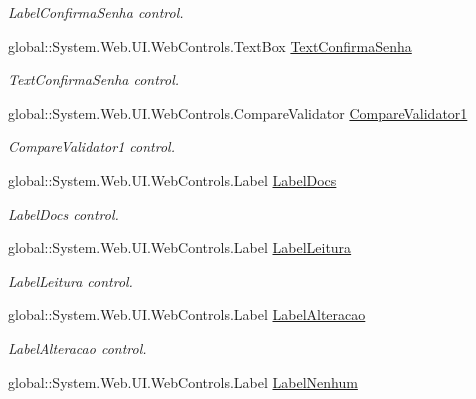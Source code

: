\begin{DoxyCompactItemize}
\begin{DoxyCompactList}\small\item\em LabelConfirmaSenha control. \item\end{DoxyCompactList}\item 
global::System.Web.UI.WebControls.TextBox \hyperlink{class_sistema_r_h_1_1_cadastro_user_a229680f0d1904176b3326e112b2e08b4}{TextConfirmaSenha}
\begin{DoxyCompactList}\small\item\em TextConfirmaSenha control. \item\end{DoxyCompactList}\item 
global::System.Web.UI.WebControls.CompareValidator \hyperlink{class_sistema_r_h_1_1_cadastro_user_adb506525ca9a486d2a2af45ca2ebfeea}{CompareValidator1}
\begin{DoxyCompactList}\small\item\em CompareValidator1 control. \item\end{DoxyCompactList}\item 
global::System.Web.UI.WebControls.Label \hyperlink{class_sistema_r_h_1_1_cadastro_user_aaeb55ba4d615da19496bdd9cca8830d0}{LabelDocs}
\begin{DoxyCompactList}\small\item\em LabelDocs control. \item\end{DoxyCompactList}\item 
global::System.Web.UI.WebControls.Label \hyperlink{class_sistema_r_h_1_1_cadastro_user_a5854d3064b2bd301797b09d1da2575f6}{LabelLeitura}
\begin{DoxyCompactList}\small\item\em LabelLeitura control. \item\end{DoxyCompactList}\item 
global::System.Web.UI.WebControls.Label \hyperlink{class_sistema_r_h_1_1_cadastro_user_af660906708afbeb2ef5533a8cb9e3e05}{LabelAlteracao}
\begin{DoxyCompactList}\small\item\em LabelAlteracao control. \item\end{DoxyCompactList}\item 
global::System.Web.UI.WebControls.Label \hyperlink{class_sistema_r_h_1_1_cadastro_user_a28628279d4844482bbdd9bd6343e74fd}{LabelNenhum}

\end{DoxyCompactItemize}
